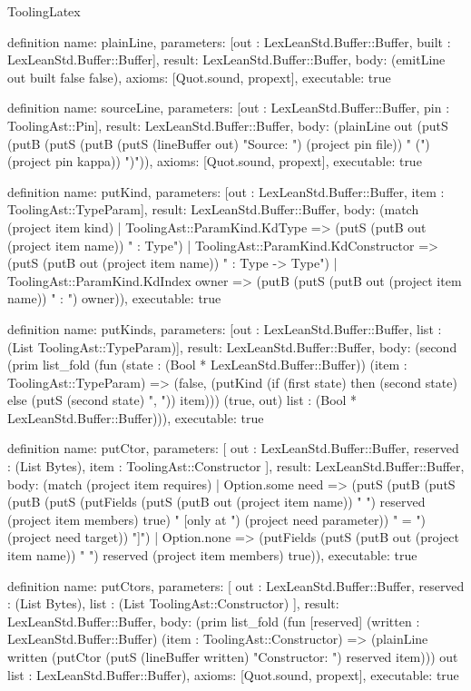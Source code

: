 \begin{lexlean}{ToolingLatex}
\begin{semanticmodule}
definition{
  name: plainLine,
  parameters: [out : LexLeanStd.Buffer::Buffer, built : LexLeanStd.Buffer::Buffer],
  result: LexLeanStd.Buffer::Buffer,
  body: (emitLine out built false false),
  axioms: [Quot.sound, propext],
  executable: true
}

definition{
  name: sourceLine,
  parameters: [out : LexLeanStd.Buffer::Buffer, pin : ToolingAst::Pin],
  result: LexLeanStd.Buffer::Buffer,
  body: (plainLine out (putS (putB (putS (putB (putS (lineBuffer out) "Source: ") (project pin file)) " (") (project pin kappa)) ")")),
  axioms: [Quot.sound, propext],
  executable: true
}

definition{
  name: putKind,
  parameters: [out : LexLeanStd.Buffer::Buffer, item : ToolingAst::TypeParam],
  result: LexLeanStd.Buffer::Buffer,
  body: (match (project item kind)
    | ToolingAst::ParamKind.KdType => (putS (putB out (project item name)) " : Type")
    | ToolingAst::ParamKind.KdConstructor => (putS (putB out (project item name)) " : Type -> Type")
    | ToolingAst::ParamKind.KdIndex owner => (putB (putS (putB out (project item name)) " : ") owner)),
  executable: true
}

definition{
  name: putKinds,
  parameters: [out : LexLeanStd.Buffer::Buffer, list : (List ToolingAst::TypeParam)],
  result: LexLeanStd.Buffer::Buffer,
  body: (second (prim list_fold (fun (state : (Bool * LexLeanStd.Buffer::Buffer)) (item : ToolingAst::TypeParam) => (false, (putKind (if (first state) then (second state) else (putS (second state) ", ")) item))) (true, out) list : (Bool * LexLeanStd.Buffer::Buffer))),
  executable: true
}

definition{
  name: putCtor,
  parameters: [
    out : LexLeanStd.Buffer::Buffer,
    reserved : (List Bytes),
    item : ToolingAst::Constructor
  ],
  result: LexLeanStd.Buffer::Buffer,
  body: (match (project item requires)
    | Option.some need => (putS (putB (putS (putB (putS (putFields (putS (putB out (project item name)) " ") reserved (project item members) true) " [only at ") (project need parameter)) " = ") (project need target)) "]")
    | Option.none => (putFields (putS (putB out (project item name)) " ") reserved (project item members) true)),
  executable: true
}

definition{
  name: putCtors,
  parameters: [
    out : LexLeanStd.Buffer::Buffer,
    reserved : (List Bytes),
    list : (List ToolingAst::Constructor)
  ],
  result: LexLeanStd.Buffer::Buffer,
  body: (prim list_fold (fun [reserved] (written : LexLeanStd.Buffer::Buffer) (item : ToolingAst::Constructor) => (plainLine written (putCtor (putS (lineBuffer written) "Constructor: ") reserved item))) out list : LexLeanStd.Buffer::Buffer),
  axioms: [Quot.sound, propext],
  executable: true
}


\end{semanticmodule}
\end{lexlean}
